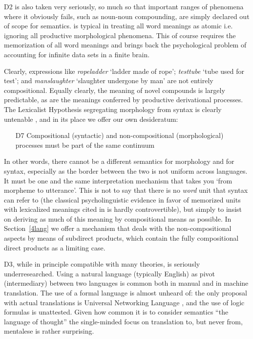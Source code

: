\documentclass[output=paper,colorlinks=true,citecolor=brown]{langscibook}
\begin{document}
\medskip\noindent D2 is also taken very seriously, so much so that important
ranges of phenomena where it obviously fails, such as noun-noun compounding,
are simply declared out of scope for semantics. \citet{Fodor:1998} is typical
in treating all word meanings as atomic i.e. ignoring all productive
morphological phenomena. This of course requires the memorization of all word
meanings and brings back the psychological problem
\citep{Partee:1979,Partee:2013} of accounting for infinite data sets in a
finite brain.

Clearly, expressions like {\it ropeladder} `ladder made of rope'; {\it
  testtube} `tube used for test'; and {\it manslaughter} `slaughter undergone
by man' \citep{Kiparsky:1982b} are not entirely compositional. Equally
clearly, the meaning of novel compounds is largely predictable, as are the
meanings conferred by productive derivational processes. The Lexicalist
Hypothesis \citep{Chomsky:1970} segregating morphology from syntax is clearly
untenable \citep{Bruening:2018}, and in its place we offer our own
desideratum:

\begin{itemize}
\item[D7] 
  Compositional (syntactic) and non-compositional (morphological)
  process\-es must be part of the same continuum
\end{itemize}

In other words, there cannot be a different semantics for morphology and for
syntax, especially as the border between the two is not uniform across
languages. It must be one and the same interpretation mechanism that takes you
`from morpheme to utterance'. This is not to say that there is no {\it word}
unit that syntax can refer to (the classical psycholinguistic evidence in
favor of memorized units with lexicalized meanings cited in \cite{Muller:2018}
is hardly controvertible), but simply to insist on deriving as much of this
meaning by compositional means as possible. In Section~\ref{4lang} we offer a
mechanism that deals with the non-compositional aspects by means of subdirect
products, which contain the fully compositional direct products as a limiting
case.

\medskip\noindent D3, while in principle compatible with many theories, is
seriously underresearch\-ed. Using a natural language (typically English) as
pivot (intermediary) between two languages is common both in manual and in
machine translation. The use of a formal language is almost unheard of: the
only proposal with actual translations is Universal Networking Language
\citep{Cardenosa:2005}, and the use of logic formulas is unattested. Given how
common it is to consider semantics ``the language of thought'' the
single-minded focus on translation to, but never from, mentalese is rather
surprising.
\end{document}
